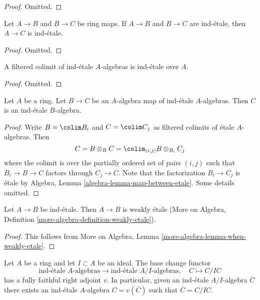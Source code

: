 \begin{proof}
Omitted.
\end{proof}

\begin{lemma}
\label{lemma-composition-ind-etale}
Let $A \to B$ and $B \to C$ be ring maps. If $A \to B$ and $B \to C$
are ind-\'etale, then $A \to C$ is ind-\'etale.
\end{lemma}

\begin{proof}
Omitted.
\end{proof}

\begin{lemma}
\label{lemma-ind-ind-etale}
A filtered colimit of ind-\'etale $A$-algebras is ind-\'etale over $A$.
\end{lemma}

\begin{proof}
Omitted.
\end{proof}

\begin{lemma}
\label{lemma-ind-etale-permanence}
Let $A$ be a ring. Let $B \to C$ be an $A$-algebra map of ind-\'etale
$A$-algebras. Then $C$ is an ind-\'etale $B$-algebra.
\end{lemma}

\begin{proof}
Write $B = \colim B_i$ and $C = \colim C_j$ as filtered colimits
of \'etale $A$-algebras. Then
$$
C = B \otimes_B C = \colim_{(i, j)} B \otimes_{B_i} C_j
$$
where the colimit is over the partially ordered set of pairs $(i, j)$
such that $B_i \to B \to C$ factors through $C_j \to C$. Note that
the factorization $B_i \to C_j$ is \'etale by
Algebra, Lemma \ref{algebra-lemma-map-between-etale}.
Some details omitted.
\end{proof}

\begin{lemma}
\label{lemma-ind-etale-implies}
Let $A \to B$ be ind-\'etale. Then $A \to B$ is weakly \'etale
(More on Algebra, Definition \ref{more-algebra-definition-weakly-etale}).
\end{lemma}

\begin{proof}
This follows from More on Algebra, Lemma
\ref{more-algebra-lemma-when-weakly-etale}.
\end{proof}

\begin{lemma}
\label{lemma-lift-ind-etale}
Let $A$ be a ring and let $I \subset A$ be an ideal. The base change functor
$$
\text{ind-\'etale }A\text{-algebras}
\longrightarrow
\text{ind-\'etale }A/I\text{-algebras},\quad
C \longmapsto C/IC
$$
has a fully faithful right adjoint $v$. In particular, given
an ind-\'etale $A/I$-algebra $\overline{C}$ there exists
an ind-\'etale $A$-algebra $C = v(\overline{C})$ such that
$\overline{C} = C/IC$.
\end{lemma}

